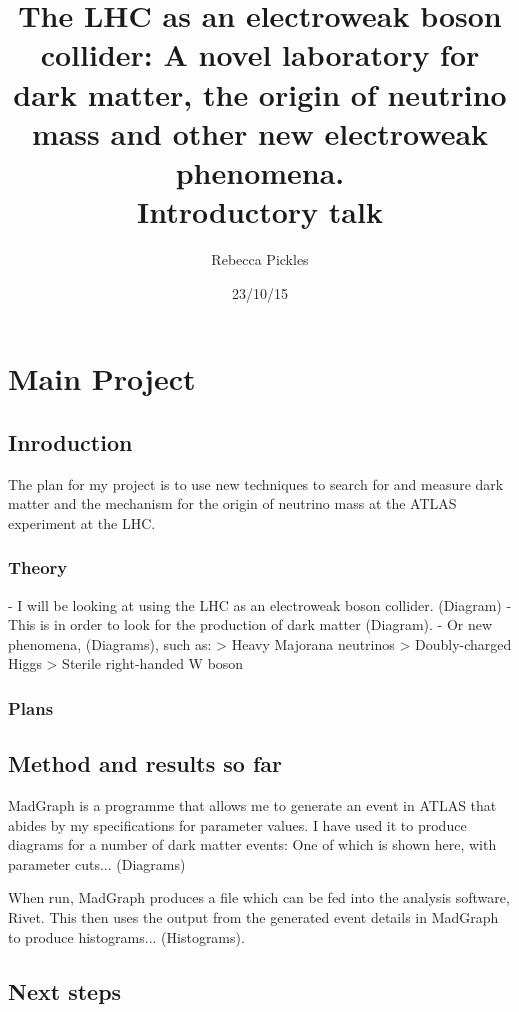 \documentclass[12pt, a4paper]{article}
\begin{document}
\title{\Large{The LHC as an electroweak boson collider: A novel laboratory for dark matter, the origin of neutrino mass and other new electroweak phenomena. \\ Introductory talk}}
\author{Rebecca Pickles}
\date{{23/10/15}}
\maketitle

\section{Main Project}
\subsection{Inroduction}

The plan for my project is to use new techniques to search for and measure dark matter and the mechanism for the origin of neutrino mass at the ATLAS experiment at the LHC. 
\subsubsection{Theory}
- I will be looking at using the LHC as an electroweak boson collider.
(Diagram)
- This is in order to look for the production of dark matter (Diagram).
- Or new phenomena, (Diagrams), such as:
    > Heavy Majorana neutrinos
    > Doubly-charged Higgs
    > Sterile right-handed W boson

\subsubsection{Plans} 

\subsection{Method and results so far}
MadGraph is a programme that allows me to generate an event in ATLAS that abides by my specifications for parameter values.
I have used it to produce diagrams for a number of dark matter events:
One of which is shown here, with parameter cuts...
(Diagrams) 

When run, MadGraph produces a file which can be fed into the analysis software, Rivet. This then uses the output from the generated event details in MadGraph to produce histograms... (Histograms).
  
\subsection{Next steps}
\end{document}
